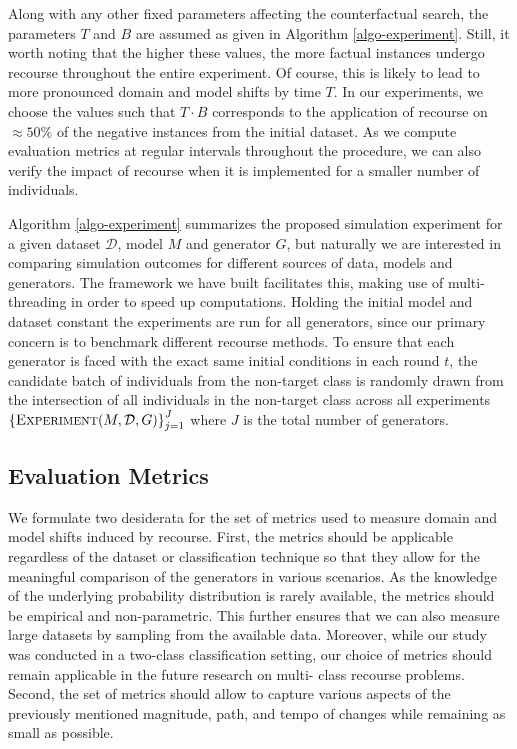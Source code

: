 \documentclass[conference,final,]{IEEEtran}
\theoremstyle{definition}
\theoremstyle{definition}
\theoremstyle{definition}
\theoremstyle{definition}
\theoremstyle{remark}
\begin{document}
Along with any other fixed parameters affecting the counterfactual search, the parameters \(T\) and \(B\) are assumed as given in Algorithm \ref{algo-experiment}. Still, it worth noting that the higher these values, the more factual instances undergo recourse throughout the entire experiment. Of course, this is likely to lead to more pronounced domain and model shifts by time \(T\). In our experiments, we choose the values such that \(T \cdot B\) corresponds to the application of recourse on \(\approx50\%\) of the negative instances from the initial dataset. As we compute evaluation metrics at regular intervals throughout the procedure, we can also verify the impact of recourse when it is implemented for a smaller number of individuals.

Algorithm \ref{algo-experiment} summarizes the proposed simulation experiment for a given dataset \(\mathcal{D}\), model \(M\) and generator \(G\), but naturally we are interested in comparing simulation outcomes for different sources of data, models and generators. The framework we have built facilitates this, making use of multi-threading in order to speed up computations. Holding the initial model and dataset constant the experiments are run for all generators, since our primary concern is to benchmark different recourse methods. To ensure that each generator is faced with the exact same initial conditions in each round \(t\), the candidate batch of individuals from the non-target class is randomly drawn from the intersection of all individuals in the non-target class across all experiments \(\left\{\textsc{Experiment}(M,\mathcal{D},G)\right\}_{j=1}^J\) where \(J\) is the total number of generators.

\hypertarget{method-2-metrics}{%
\subsection{Evaluation Metrics}\label{method-2-metrics}}

We formulate two desiderata for the set of metrics used to measure domain and model shifts induced by recourse. First, the metrics should be applicable regardless of the dataset or classification technique so that they allow for the meaningful comparison of the generators in various scenarios. As the knowledge of the underlying probability distribution is rarely available, the metrics should be empirical and non-parametric. This further ensures that we can also measure large datasets by sampling from the available data. Moreover, while our study was conducted in a two-class classification setting, our choice of metrics should remain applicable in the future research on multi- class recourse problems. Second, the set of metrics should allow to capture various aspects of the previously mentioned magnitude, path, and tempo of changes while remaining as small as possible.
\end{document}
